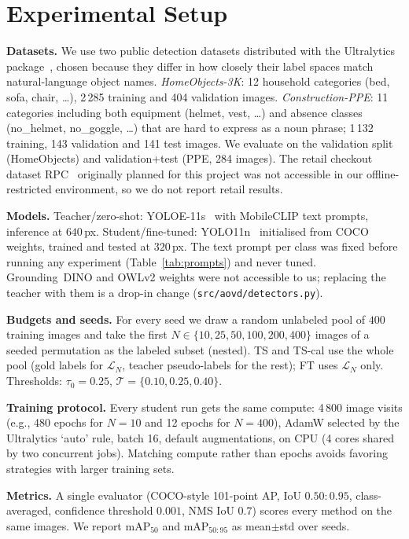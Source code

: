 \documentclass[conference]{IEEEtran}
\begin{document}
\section{Experimental Setup}
\textbf{Datasets.} We use two public detection datasets distributed with the Ultralytics package~\cite{ultralyticsdatasets}, chosen because they differ in how closely their label spaces match natural-language object names. \emph{HomeObjects-3K}: 12 household categories (bed, sofa, chair, \dots), 2\,285 training and 404 validation images. \emph{Construction-PPE}: 11 categories including both equipment (helmet, vest, \dots) and absence classes (no\_helmet, no\_goggle, \dots) that are hard to express as a noun phrase; 1\,132 training, 143 validation and 141 test images. We evaluate on the validation split (HomeObjects) and validation+test (PPE, 284 images). The retail checkout dataset RPC~\cite{wei2019rpc} originally planned for this project was not accessible in our offline-restricted environment, so we do not report retail results.

\textbf{Models.} Teacher/zero-shot: YOLOE-11s~\cite{wang2025yoloe} with MobileCLIP text prompts, inference at $640$\,px. Student/fine-tuned: YOLO11n~\cite{jocher2024yolo11} initialised from COCO~\cite{lin2014coco} weights, trained and tested at $320$\,px. The text prompt per class was fixed before running any experiment (Table~\ref{tab:prompts}) and never tuned. Grounding~DINO and OWLv2 weights were not accessible to us; replacing the teacher with them is a drop-in change (\texttt{src/aovd/detectors.py}).

\textbf{Budgets and seeds.} For every seed we draw a random unlabeled pool of $400$ training images and take the first $N\in\{10,25,50,100,200,400\}$ images of a seeded permutation as the labeled subset (nested). TS and TS-cal use the whole pool (gold labels for $\mathcal{L}_N$, teacher pseudo-labels for the rest); FT uses $\mathcal{L}_N$ only. Thresholds: $\tau_0=0.25$, $\mathcal{T}=\{0.10,0.25,0.40\}$.

\textbf{Training protocol.} Every student run gets the same compute: 4\,800 image visits (e.g., 480 epochs for $N{=}10$ and 12 epochs for $N{=}400$), AdamW selected by the Ultralytics `auto' rule, batch 16, default augmentations, on CPU (4 cores shared by two concurrent jobs). Matching compute rather than epochs avoids favoring strategies with larger training sets.

\textbf{Metrics.} A single evaluator (COCO-style 101-point AP, IoU $0.50{:}0.95$, class-averaged, confidence threshold $0.001$, NMS IoU $0.7$) scores every method on the same images. We report mAP$_{50}$ and mAP$_{50:95}$ as mean$\pm$std over seeds.
\end{document}
